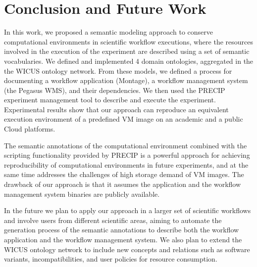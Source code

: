 \section{Conclusion and Future Work}
\label{sec:conclusion}

In this work, we proposed a semantic modeling approach to conserve computational environments in scientific workflow executions, where  the resources involved in the execution of the experiment are described using a set of semantic vocabularies. We defined and implemented 4 domain ontologies, aggregated in the the WICUS ontology network. From these models, we defined a process for documenting a workflow application (Montage), a workflow management system (the Pegasus WMS), and their dependencies. We then used the PRECIP experiment management tool to describe and execute the experiment. Experimental results show that our approach can reproduce an equivalent execution environment of a predefined VM image on an academic and a public Cloud platforms.

The semantic annotations of the computational environment combined with the scripting functionality provided by PRECIP is a powerful approach for achieving reproducibility of computational environments in future experiments, and at the same time addresses the challenges of high storage demand of VM images. The drawback of our approach is that it assumes the application and the workflow management system binaries are publicly available.

In the future we plan to apply our approach in a larger set of scientific workflows and involve users from different scientific areas, aiming to automate the generation process of the semantic annotations to describe both the workflow application and the workflow management system. We also plan to extend the WICUS ontology network to include new concepts and relations such as software variants, incompatibilities, and user policies for resource consumption.